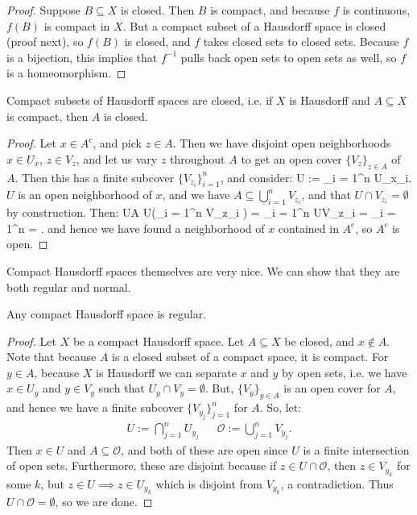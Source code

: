 	\begin{proof}
		Suppose $B\subseteq X$ is closed. Then $B$ is compact, and because $f$ is continuous, $f(B)$ is compact in $X$. 
		But a compact subset of a Hausdorff space is closed (proof next), so $f(B)$ is closed, and $f$ takes closed sets to 
		closed sets. Because $f$ is a bijection, this implies that $f^{-1}$ pulls back open sets to open sets as well, so $f$ is 
		a homeomorphism. 
	\end{proof}
	
	\begin{prop}
		Compact subsets of Hausdorff spaces are closed, i.e. if $X$ is Hausdorff and $A\subseteq X$ is compact, then $A$ 
		is closed. 
	\end{prop}
	
	\begin{proof}
		Let $x\in A^c$, and pick $z\in A$. Then we have disjoint open neighborhoods $x\in U_x$, $z\in V_z$, and let us vary 
		$z$ throughout $A$ to get an open cover $\{V_z\}_{z\in A}$ of $A$. Then this has a finite subcover 
		$\{V_{z_i}\}_{i = 1}^n$, and consider:
		\eq
			U := \bigcap_{i = 1}^n U_{x_i}.
		\qe
		$U$ is an open neighborhood of $x$, and we have $A\subseteq \bigcup_{i = 1}^n V_{z_i}$, and that $U\cap V_{z_i} 
		= \emptyset$ by construction. Then:
		\eq
			U\cap A \subseteq U\cap \left(\bigcup_{i = 1}^n V_{z_i} \right) = \bigcup_{i = 1}^n U\cap V_{z_i} = \bigcup_{i = 1}^n
			\emptyset = \emptyset.
		\qe
		and hence we have found a neighborhood of $x$ contained in $A^c$, so $A^c$ is open.
	\end{proof}
	
	Compact Hausdorff spaces themselves are very nice. We can show that they are both regular and normal.
	
	\begin{prop}
		Any compact Hausdorff space is regular.
	\end{prop}
	
	\begin{proof}
		Let $X$ be a compact Hausdorff space. Let $A\subseteq X$ be closed, and $x\notin A$. Note that because $A$ 
		is a closed subset of a compact space, it is compact. For $y\in A$, because $X$ is Hausdorff we can separate $x$ 
		and $y$ by open sets, i.e. we have $x\in U_y$ and $y\in V_y$ such that $U_y\cap V_y = \emptyset$. But, 
		$\{V_y\}_{y\in A}$ is an open cover for $A$, and hence we have a finite subcover $\{V_{y_j}\}_{j = 1}^n$ for $A$. 
		So, let:
		\begin{align}
			U := \bigcap_{j = 1}^n U_{y_j} && \mathcal O := \bigcup_{j = 1}^n V_{y_j}.
		\end{align}
		Then $x\in U$ and $A\subseteq \mathcal O$, and both of these are open since $U$ is a finite intersection of 
		open sets. Furthermore, these are disjoint because if $z\in U\cap\mathcal O$, then $z\in V_{y_k}$ for some 
		$k$, but $z\in U\implies z\in U_{y_k}$ which is disjoint from $V_{y_k}$, a contradiction. Thus $U\cap
		\mathcal O = \emptyset$, so we are done.
	\end{proof}
	
